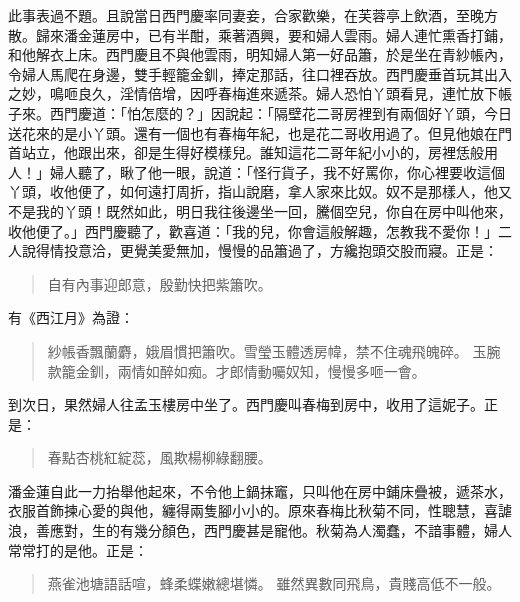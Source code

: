此事表過不題。且說當日西門慶率同妻妾，合家歡樂，在芙蓉亭上飲酒，至晚方散。歸來潘金蓮房中，已有半酣，乘著酒興，要和婦人雲雨。婦人連忙熏香打鋪，和他解衣上床。西門慶且不與他雲雨，明知婦人第一好品簫，於是坐在青紗帳內，令婦人馬爬在身邊，雙手輕籠金釧，捧定那話，往口裡吞放。西門慶垂首玩其出入之妙，鳴咂良久，淫情倍增，因呼春梅進來遞茶。婦人恐怕丫頭看見，連忙放下帳子來。西門慶道：「怕怎麼的？」因說起：「隔壁花二哥房裡到有兩個好丫頭，今日送花來的是小丫頭。還有一個也有春梅年紀，也是花二哥收用過了。但見他娘在門首站立，他跟出來，卻是生得好模樣兒。誰知這花二哥年紀小小的，房裡恁般用人！」婦人聽了，瞅了他一眼，說道：「怪行貨子，我不好罵你，你心裡要收這個丫頭，收他便了，如何遠打周折，指山說磨，拿人家來比奴。奴不是那樣人，他又不是我的丫頭！既然如此，明日我往後邊坐一回，騰個空兒，你自在房中叫他來，收他便了。」西門慶聽了，歡喜道：「我的兒，你會這般解趣，怎教我不愛你！」二人說得情投意洽，更覺美愛無加，慢慢的品簫過了，方纔抱頭交股而寢。正是：
\begin{quote}
自有內事迎郎意，殷勤快把紫簫吹。
\end{quote}
有《西江月》為證：
\begin{quote}
紗帳香飄蘭麝，娥眉慣把簫吹。雪瑩玉體透房幃，禁不住魂飛魄碎。
玉腕款籠金釧，兩情如醉如痴。才郎情動囑奴知，慢慢多咂一會。
\end{quote}

到次日，果然婦人往孟玉樓房中坐了。西門慶叫春梅到房中，收用了這妮子。正是：
\begin{quote}
春點杏桃紅綻蕊，風欺楊柳綠翻腰。
\end{quote}

潘金蓮自此一力抬舉他起來，不令他上鍋抹竈，只叫他在房中鋪床疊被，遞茶水，衣服首飾揀心愛的與他，纏得兩隻腳小小的。原來春梅比秋菊不同，性聰慧，喜謔浪，善應對，生的有幾分顏色，西門慶甚是寵他。秋菊為人濁蠢，不諳事體，婦人常常打的是他。正是：
\begin{quote}
燕雀池塘語話喧，蜂柔蝶嫩總堪憐。
雖然異數同飛鳥，貴賤高低不一般。
\end{quote}
